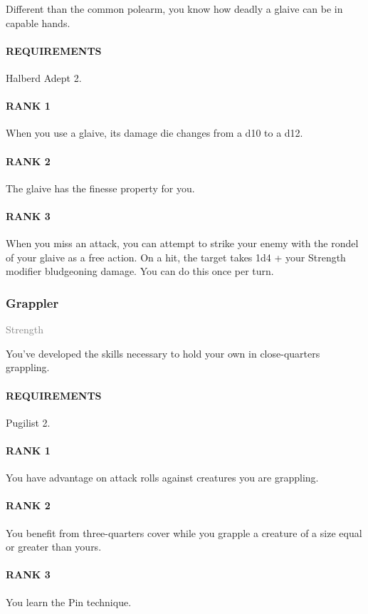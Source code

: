 \normalsize
Different than the common polearm, you know how deadly a glaive can be in capable hands.
\paragraph{REQUIREMENTS} Halberd Adept 2.
\paragraph{RANK 1} When you use a glaive, its damage die changes from a d10 to a d12.
\paragraph{RANK 2} The glaive has the finesse property for you.
\paragraph{RANK 3} When you miss an attack, you can attempt to strike your enemy with the rondel of your glaive as a free action.
On a hit, the target takes 1d4 + your Strength modifier bludgeoning damage.
You can do this once per turn.

\subsubsection{Grappler} \label{feat::grappler}
\small{\textcolor{gray}{Strength}}

\normalsize
You've developed the skills necessary to hold your own in close-quarters grappling.
\paragraph{REQUIREMENTS} Pugilist 2.
\paragraph{RANK 1} You have advantage on attack rolls against creatures you are grappling.
\paragraph{RANK 2} You benefit from three-quarters cover while you grapple a creature of a size equal or greater than yours.
\paragraph{RANK 3} You learn the Pin technique.

